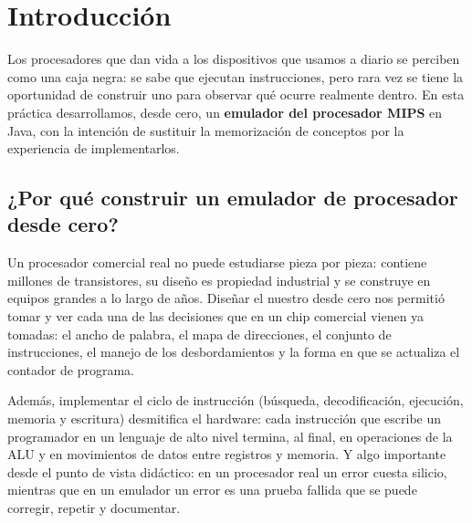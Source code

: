 \documentclass[11pt,letterpaper,oneside]{article}
\begin{document}

\setcounter{page}{2}
{\sffamily
  \renewcommand{\contentsname}{\color{uvblue}\Large\bfseries Índice}
  \tableofcontents
}
\newpage

\setcounter{page}{1}

\section{Introducción}

Los procesadores que dan vida a los dispositivos que usamos a diario se
perciben como una caja negra: se sabe que ejecutan instrucciones, pero rara vez
se tiene la oportunidad de construir uno para observar qué ocurre realmente
dentro. En esta práctica desarrollamos, desde cero, un \textbf{emulador del
procesador MIPS} en Java, con la intención de sustituir la memorización de
conceptos por la experiencia de implementarlos.

\subsection{¿Por qué construir un emulador de procesador desde cero?}

Un procesador comercial real no puede estudiarse pieza por pieza: contiene
millones de transistores, su diseño es propiedad industrial y se construye en
equipos grandes a lo largo de años. Diseñar el nuestro desde cero nos permitió
tomar y ver cada una de las decisiones que en un chip comercial vienen ya
tomadas: el ancho de palabra, el mapa de direcciones, el conjunto de
instrucciones, el manejo de los desbordamientos y la forma en que se actualiza
el contador de programa.

Además, implementar el ciclo de instrucción (búsqueda, decodificación,
ejecución, memoria y escritura) desmitifica el hardware: cada instrucción que
escribe un programador en un lenguaje de alto nivel termina, al final, en
operaciones de la ALU y en movimientos de datos entre registros y memoria. Y
algo importante desde el punto de vista didáctico: en un procesador real un
error cuesta silicio, mientras que en un emulador un error es una prueba
fallida que se puede corregir, repetir y documentar.
\end{document}
